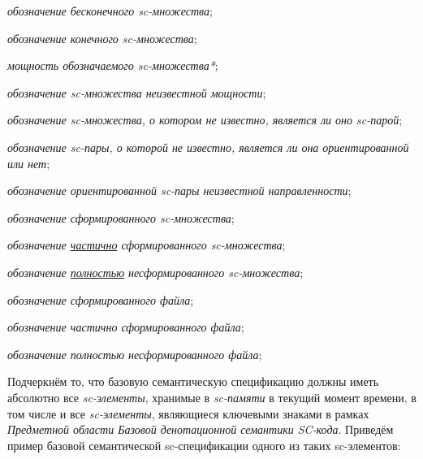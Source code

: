 \begin{textitemize}
	\item \textit{обозначение бесконечного sc-множества};
	\item \textit{обозначение конечного sc-множества};
	\item \textit{мощность обозначаемого sc-множества*};
	\item \textit{обозначение sc-множества неизвестной мощности};
	\item \textit{обозначение sc-множества, о котором не известно, является ли оно sc-парой};
	\item \textit{обозначение sc-пары, о которой не известно, является ли она ориентированной или нет};
	\item \textit{обозначение ориентированной sc-пары неизвестной направленности};
	\item \textit{обозначение сформированного sc-множества};
	\item \textit{обозначение \underline{частично} сформированного sc-множества};
	\item \textit{обозначение \underline{полностью} несформированного sc-множества};
	\item \textit{обозначение сформированного файла};
	\item \textit{обозначение частично сформированного файла};
	\item \textit{обозначение полностью несформированного файла};
\end{textitemize}

Подчеркнём то, что базовую семантическую спецификацию должны иметь абсолютно все \textit{sc-элементы}, хранимые в \textit{sc-памяти} в текущий момент времени, в том числе и все \textit{sc-элементы}, являющиеся ключевыми знаками в рамках \textit{Предметной области Базовой денотационной семантики SC-кода}. Приведём пример базовой семантической sc-спецификации одного из таких sc-элементов:
 
